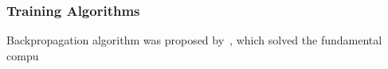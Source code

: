 \subsubsection{Training Algorithms}
Backpropagation algorithm was proposed by~\citet{werbos1975beyond}, which solved the fundamental compu
